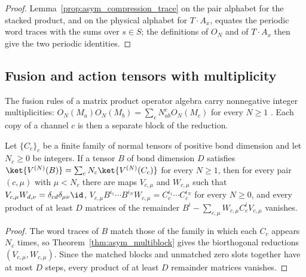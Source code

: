 \begin{proof}
    \leanok
    Lemma~\ref{prop:asym_compression_trace} on the pair alphabet for
    the stacked product, and on the physical alphabet for $T\cdot A_x$,
    equates the periodic word traces with the sums over $s\in S$; the
    definitions of $O_N$ and of $T\cdot A_x$ then give the two periodic
    identities.
\end{proof}

\subsection{Fusion and action tensors with multiplicity}%
\label{subsec:asym_fusion_multiplicity}

The fusion rules of a matrix product operator algebra carry
nonnegative integer multiplicities: $O_N(M_a)O_N(M_b)=\sum_c
    N_{ab}^cO_N(M_c)$ for every $N\geq1$ \cite{GarreRubio2023MPOSym}. Each copy
of a channel $c$ is then a separate block of the reduction.

\begin{lemma}
    \label{thm:asym_multiplicity_reductions}
    \leanok
    Let $\{C_c\}_c$ be a finite family of normal tensors of positive bond
    dimension and let $N_c\geq0$ be integers. If a tensor $B$ of bond
    dimension $D$ satisfies $\ket{V^{(N)}(B)}=\sum_cN_c\ket{V^{(N)}(C_c)}$
    for every $N\geq1$, then for every pair $(c,\mu)$ with $\mu<N_c$
    there are maps $V_{c,\mu}$ and $W_{c,\mu}$ such that
    $V_{c,\mu}W_{d,\nu}=\delta_{cd}\delta_{\mu\nu}\id$,
    $V_{c,\mu}B^{i_1}\cdots B^{i_N}W_{c,\mu}=C_c^{i_1}\cdots C_c^{i_N}$ for
    every $N\geq0$, and every product of at least $D$ matrices of the
    remainder $B^i-\sum_{c,\mu}W_{c,\mu}C_c^iV_{c,\mu}$ vanishes.
\end{lemma}

\begin{proof}
    \leanok
    The word traces of $B$ match those of the family in which each $C_c$
    appears $N_c$ times, so Theorem~\ref{thm:asym_multiblock} gives the
    biorthogonal reductions $(V_{c,\mu},W_{c,\mu})$. Since the matched blocks
    and unmatched zero slots together have at most $D$ steps, every product
    of at least $D$ remainder matrices vanishes.
\end{proof}


